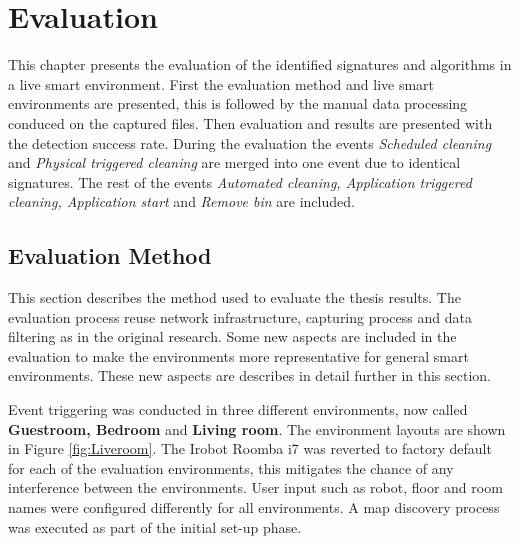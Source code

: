 \chapter{Evaluation}
\label{cap:Evaluation}
This chapter presents the evaluation of the identified signatures and algorithms in a live smart environment. First the evaluation method and live smart environments are presented, this is followed by the manual data processing conduced on the captured files. Then evaluation and results are presented with the detection success rate. During the evaluation the events \textit{Scheduled cleaning} and \textit{Physical triggered cleaning} are merged into one event due to identical signatures. The rest of the events \textit{Automated cleaning, Application triggered cleaning, Application start} and \textit{Remove bin} are included.

\section{Evaluation Method}
This section describes the method used to evaluate the thesis results. The evaluation process reuse network infrastructure, capturing process and data filtering as in the original research. Some new aspects are included in the evaluation to make the environments more representative for general smart environments. These new aspects are describes in detail further in this section.

Event triggering was conducted in three different environments, now called \textbf{Guestroom, Bedroom} and \textbf{Living room}. The environment layouts are shown in Figure \ref{fig:Liveroom}. The Irobot Roomba i7 was reverted to factory default for each of the evaluation environments, this mitigates the chance of any interference between the environments. User input such as robot, floor and room names were configured differently for all environments. A map discovery process was executed as part of the initial set-up phase.

